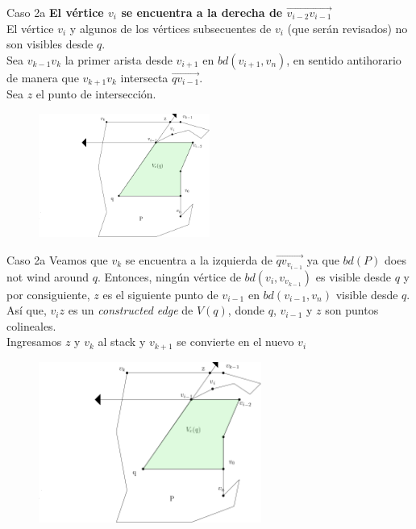 \documentclass[aspectratio=169,xcolor=dvipsnames, t]{beamer}
\begin{document}
\begin{frame}{Caso 2a}
    \textbf{El vértice $v_{i}$ se encuentra a la derecha de $\overrightarrow{v_{i-2}v_{i-1}}$}\\
    El vértice $v_{i}$ y algunos de los vértices subsecuentes de $v_{i}$ (que serán revisados) no son visibles desde $q$.\\
    \vspace{0.5cm}
    Sea $v_{k-1}v_{k}$ la primer arista desde $v_{i+1}$ en $bd(v_{i+1},v_{n})$, en sentido antihorario de manera que $v_{k+1}v_{k}$ intersecta $\overrightarrow{qv_{i-1}}$.\\
    \vspace{0.5cm}
    Sea $z$ el punto de intersección.
    \begin{figure}
            \centering
            \includegraphics[width=0.5\textwidth]{imagenes/Caso2.4b.png}
    \end{figure}
\end{frame}


\begin{frame}{Caso 2a}
    Veamos que $v_{k}$ se encuentra a la izquierda de $\overrightarrow{qv_{v_{i-1}}}$ ya que $bd(P)$ does not wind around $q$. Entonces, ningún vértice de $bd(v_{i}, v_{v_{k-1}})$ es visible desde $q$ y por consiguiente, $z$ es el siguiente punto de $v_{i-1}$ en $bd(v_{i-1}, v_{n})$ visible desde $q$. Así que, $v_{i}z$ es un \textit{constructed edge} de $V(q)$, donde $q$, $v_{i-1}$ y $z$ son puntos colineales.\\
    \vspace{0.5cm}
    Ingresamos $z$ y $v_{k}$ al stack y $v_{k+1}$ se convierte en el nuevo $v_{i}$
    \begin{figure}
            \centering
            \includegraphics[width=0.65\textwidth]{imagenes/Caso2.4b.png}
    \end{figure}
\end{frame}
\end{document}
